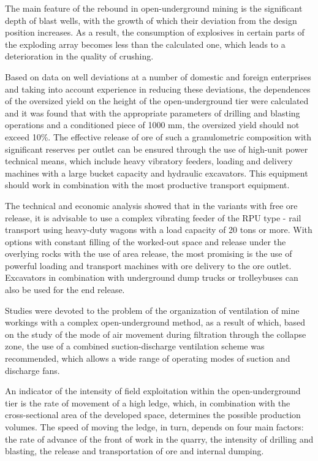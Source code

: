 \begin{multicols}{2}
The main feature of the rebound in open-underground mining is the
significant depth of blast wells, with the growth of which their
deviation from the design position increases. As a result, the
consumption of explosives in certain parts of the exploding array
becomes less than the calculated one, which leads to a deterioration in
the quality of crushing.

Based on data on well deviations at a number of domestic and foreign
enterprises and taking into account experience in reducing these
deviations, the dependences of the oversized yield on the height of the
open-underground tier were calculated and it was found that with the
appropriate parameters of drilling and blasting operations and a
conditioned piece of 1000 mm, the oversized yield should not exceed
10\%. The effective release of ore of such a granulometric composition
with significant reserves per outlet can be ensured through the use of
high-unit power technical means, which include heavy vibratory feeders,
loading and delivery machines with a large bucket capacity and hydraulic
excavators. This equipment should work in combination with the most
productive transport equipment.

The technical and economic analysis showed that in the variants with
free ore release, it is advisable to use a complex vibrating feeder of
the RPU type - rail transport using heavy-duty wagons with a load
capacity of 20 tons or more. With options with constant filling of the
worked-out space and release under the overlying rocks with the use of
area release, the most promising is the use of powerful loading and
transport machines with ore delivery to the ore outlet. Excavators in
combination with underground dump trucks or trolleybuses can also be
used for the end release.

Studies were devoted to the problem of the organization of ventilation
of mine workings with a complex open-underground method, as a result of
which, based on the study of the mode of air movement during filtration
through the collapse zone, the use of a combined suction-discharge
ventilation scheme was recommended, which allows a wide range of
operating modes of suction and discharge fans.

An indicator of the intensity of field exploitation within the
open-underground tier is the rate of movement of a high ledge, which, in
combination with the cross-sectional area of the developed space,
determines the possible production volumes. The speed of moving the
ledge, in turn, depends on four main factors: the rate of advance of the
front of work in the quarry, the intensity of drilling and blasting, the
release and transportation of ore and internal dumping.


\end{multicols}

